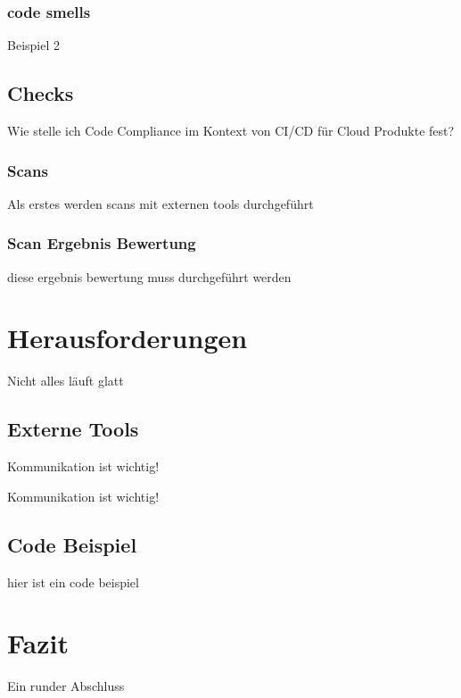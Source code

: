 \documentclass[
	12pt, %
	a4paper,
	liststotoc, %
	bibtotoc, %
	pointlessnumbers, %
	ngerman, %
	headsepline, %
	oneside %
	]{scrbook} %
\begin{document}
\subsection{code smells}\label{subsec:codesmells_beispiel}
Beispiel 2

\section{Checks}\label{sec:checks}
Wie stelle ich Code Compliance im Kontext von CI/CD für Cloud Produkte fest?
\subsection{Scans}\label{subsec:scans}

Als erstes werden scans mit externen tools durchgeführt

\subsection{Scan Ergebnis Bewertung}\label{subsec:scan_bewertung}

diese ergebnis bewertung muss durchgeführt werden

\chapter{Herausforderungen}\label{ch:herausforderungen}

Nicht alles läuft glatt

\section{Externe Tools}\label{sec:externe_tools}

Kommunikation ist wichtig!

Kommunikation ist wichtig!

\section{Code Beispiel}\label{sec:code_beispiel}

hier ist ein code beispiel

\chapter{Fazit}\label{ch:fazit}


Ein runder Abschluss
\end{document}
